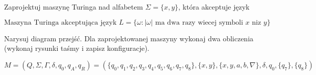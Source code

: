\documentclass[leqno]{article}
\begin{document}
            Zaprojektuj maszynę Turinga nad alfabetem  $\Sigma=\{x,y\}$, która
            akceptuje język

            \begin{equation}
                \text{Maszyna Turinga akceptująca język } L = \{\omega:|\omega| \text{ ma dwa razy wiecej symboli } x \text{ niz } y\}
            \end{equation}

            Narysuj diagram przejść. Dla zaprojektowanej maszyny wykonaj dwa obliczenia (wykonaj rysunki taśmy i zapisz konfiguracje).

            \begin{equation}
                M = (Q, \Sigma, \Gamma, \delta, q_0, q_A, q_R) = (
                    \{q_0, q_1, q_2, q_3, q_4, q_5, q_6, q_7, q_8\}, 
                    \{x, y\}, 
                    \{x, y, a, b, \nabla\}, 
                    \delta, 
                    q_0, 
                    \{q_7\}, 
                    \{q_8\}
                )
            \end{equation}
\end{document}
